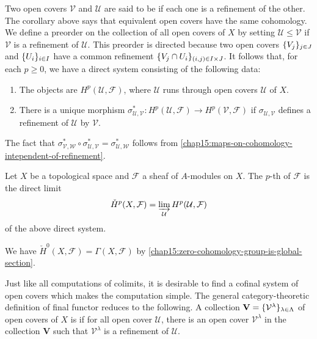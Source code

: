 Two open covers $\mathcal{V}$ and $\mathcal{U}$ are said to be  if each one is a refinement of the other. The corollary above says that equivalent open covers have the same cohomology. We define a preorder on the collection of all open covers of $X$ by setting $\mathcal{U} \leq \mathcal{V}$ if $\mathcal{V}$ is a refinement of $\mathcal{U}$. This preorder is directed because two open covers $\lbrace V_j\rbrace_{j \in J}$ and $\lbrace U_i\rbrace_{i \in I}$ have a common refinement $\lbrace V_j \cap U_i\rbrace_{(i, j) \in I \times J}$. It follows that, for each $p \geq 0$, we have a direct system consisting of the following data:
\begin{enumerate}
	\item The objects are $H^p(\mathcal{U}, \mathcal{F})$, where $\mathcal{U}$ runs through open covers $\mathcal{U}$ of $X$.
	\item There is a unique morphism $\sigma^\ast_{\mathcal{U}, \mathcal{V}} \colon H^p(\mathcal{U}, \mathcal{F}) \to H^p(\mathcal{V}, \mathcal{F})$ if $\sigma_{\mathcal{U}, \mathcal{V}} $ defines a refinement of $\mathcal{U}$ by $\mathcal{V}$.
\end{enumerate}
The fact that $\sigma^\ast_{\mathcal{V}, \mathcal{W}}\circ\sigma^\ast_{\mathcal{U}, \mathcal{V}} = \sigma^\ast_{\mathcal{U}, \mathcal{W}}$ follows from \cref{chap15:maps-on-cohomology-intependent-of-refinement}.

\begin{definition}
	Let $X$ be a topological space and $\mathcal{F}$ a sheaf of $A$-modules on $X$. The $p$-th  of $\mathcal{F}$ is the direct limit
	\begin{equation*}
		\check{H}^p(X, \mathcal{F}) = \varinjlim_{\mathcal{U}} H^p(\mathcal{U}, \mathcal{F})
	\end{equation*}
	of the above direct system.	
\end{definition}

\begin{remark}
	We have $\check{H}^0(X, \mathcal{F}) = \Gamma(X, \mathcal{F})$ by \cref{chap15:zero-cohomology-group-is-global-section}.
\end{remark}

Just like all computations of colimits, it is desirable to find a cofinal system of open covers which makes the computation simple. The general category-theoretic definition of final functor reduces to the following. A collection $\mathbf{V} = \lbrace\mathcal{V}^\lambda\rbrace_{\lambda \in \Lambda}$ of open covers of $X$ is  if for all open cover $\mathcal{U}$, there is an open cover $\mathcal{V}^\lambda$ in the collection $\mathbf{V}$ such that $\mathcal{V}^\lambda$ is a refinement of $\mathcal{U}$.

